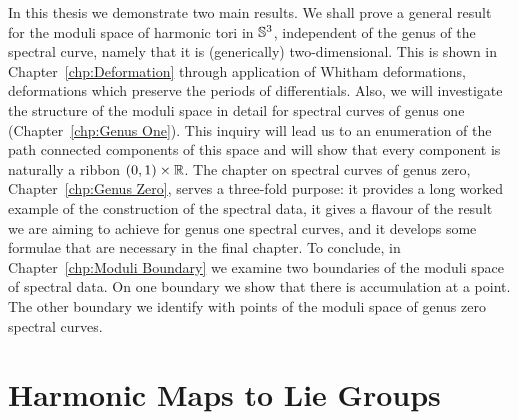 In this thesis we demonstrate two main results. We shall prove a general result for the moduli space of harmonic tori in $\S^3$, independent of the genus of the spectral curve, namely that it is (generically) two-dimensional. This is shown in Chapter~\ref{chp:Deformation} through application of Whitham deformations, deformations which preserve the periods of differentials. Also, we will investigate the structure of the moduli space in detail for spectral curves of genus one (Chapter~\ref{chp:Genus One}). This inquiry will lead us to an enumeration of the path connected components of this space and will show that every component is naturally a ribbon $(0,1)\times \R$. The chapter on spectral curves of genus zero, Chapter~\ref{chp:Genus Zero}, serves a three-fold purpose: it provides a long worked example of the construction of the spectral data, it gives a flavour of the result we are aiming to achieve for genus one spectral curves, and it develops some formulae that are necessary in the final chapter. To conclude, in Chapter~\ref{chp:Moduli Boundary} we examine two boundaries of the moduli space of spectral data. On one boundary we show that there is accumulation at a point. The other boundary we identify with points of the moduli space of genus zero spectral curves.



















\section{Harmonic Maps to Lie Groups}

